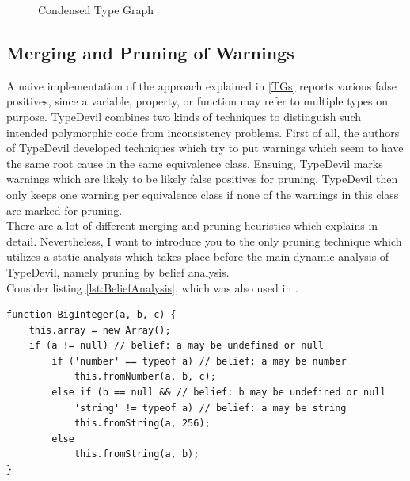 \documentclass[runningheads,a4paper]{llncs}
\begin{document}
\begin{figure}[h]
\caption{Condensed Type Graph}
\label{fig:CondensedTG}
\end{figure}


\subsection{Merging and Pruning of Warnings}

A naive implementation of the approach explained in \ref{TGs} reports various false positives, since a variable, property, or function may refer to multiple types on purpose. 
TypeDevil combines two kinds of techniques to distinguish such intended polymorphic code from inconsistency problems. 
First of all, the authors of TypeDevil developed techniques which try to put warnings which seem to have the same root cause in the same equivalence class.
Ensuing, TypeDevil marks warnings which are likely to be likely false positives for pruning.
TypeDevil then only keeps one warning per equivalence class if none of the warnings in this class are marked for pruning.\\
There are a lot of different merging and pruning heuristics which \cite{DBLP:conf/icse/PradelSS15} explains in detail.
Nevertheless, I want to introduce you to the only pruning technique which utilizes a static analysis which takes place before the main dynamic analysis of TypeDevil, namely pruning by belief analysis.\\
Consider listing \ref{lst:BeliefAnalysis}, which was also used in \cite{DBLP:conf/icse/PradelSS15}.

\medskip\medskip
\lstset{language=javascript}
\begin{minipage}{\linewidth}
\begin{lstlisting}[frame=single, caption=Pruning via Belief Analysis, label={lst:BeliefAnalysis}]
function BigInteger(a, b, c) { 
    this.array = new Array();
    if (a != null) // belief: a may be undefined or null
        if ('number' == typeof a) // belief: a may be number
            this.fromNumber(a, b, c);
        else if (b == null && // belief: b may be undefined or null
            'string' != typeof a) // belief: a may be string
            this.fromString(a, 256); 
        else  
            this.fromString(a, b);
}
\end{lstlisting}
\end{minipage}
\end{document}
